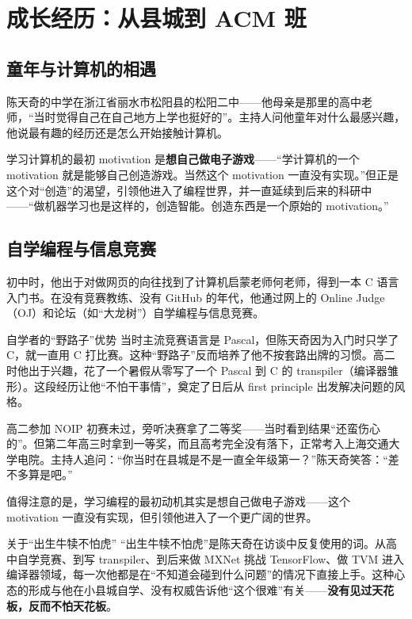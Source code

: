 \section{成长经历：从县城到 ACM 班}

\subsection{童年与计算机的相遇}

陈天奇的中学在浙江省丽水市松阳县的松阳二中------他母亲是那里的高中老师，``当时觉得自己在自己地方上学也挺好的''。主持人问他童年对什么最感兴趣，他说最有趣的经历还是怎么开始接触计算机。

学习计算机的最初 motivation 是\textbf{想自己做电子游戏}------``学计算机的一个 motivation 就是能够自己创造游戏。当然这个 motivation 一直没有实现。''但正是这个对``创造''的渴望，引领他进入了编程世界，并一直延续到后来的科研中------``做机器学习也是这样的，创造智能。创造东西是一个原始的 motivation。''

\subsection{自学编程与信息竞赛}

初中时，他出于对做网页的向往找到了计算机启蒙老师何老师，得到一本 C 语言入门书。在没有竞赛教练、没有 GitHub 的年代，他通过网上的 Online Judge（OJ）和论坛（如``大龙树''）自学编程与信息竞赛。

\begin{knowledgebox}{自学者的``野路子''优势}
当时主流竞赛语言是 Pascal，但陈天奇因为入门时只学了 C，就一直用 C 打比赛。这种``野路子''反而培养了他不按套路出牌的习惯。高二时他出于兴趣，花了一个暑假从零写了一个 Pascal 到 C 的 transpiler（编译器雏形）。这段经历让他``不怕干事情''，奠定了日后从 first principle 出发解决问题的风格。
\end{knowledgebox}

高二参加 NOIP 初赛未过，旁听决赛拿了二等奖------当时看到结果``还蛮伤心的''。但第二年高三时拿到一等奖，而且高考完全没有落下，正常考入上海交通大学电院。主持人追问：``你当时在县城是不是一直全年级第一？''陈天奇笑答：``差不多算是吧。''

值得注意的是，学习编程的最初动机其实是想自己做电子游戏------这个 motivation 一直没有实现，但引领他进入了一个更广阔的世界。

\begin{warningbox}{关于``出生牛犊不怕虎''}
``出生牛犊不怕虎''是陈天奇在访谈中反复使用的词。从高中自学竞赛、到写 transpiler、到后来做 MXNet 挑战 TensorFlow、做 TVM 进入编译器领域，每一次他都是在``不知道会碰到什么问题''的情况下直接上手。这种心态的形成与他在小县城自学、没有权威告诉他``这个很难''有关------\textbf{没有见过天花板，反而不怕天花板}。
\end{warningbox}

